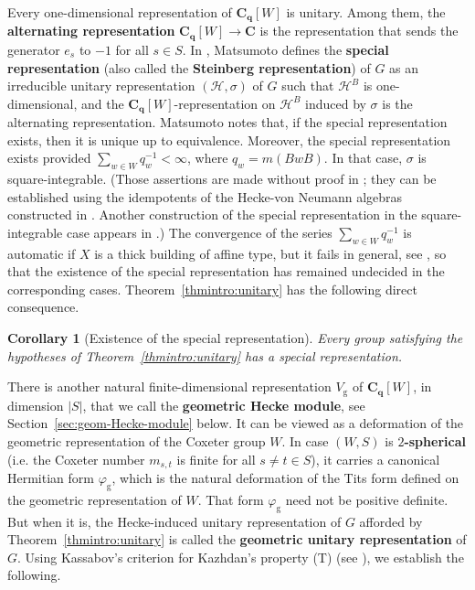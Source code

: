 \documentclass[12pt,a4paper]{amsproc}
\newtheorem{corintro}[thmintro]{Corollary}
\theoremstyle{definition}
\newcommand{\CC}{\mathbf C}
\begin{document}
 Every one-dimensional representation of $\CC_{\mathbf q}[W]$ is unitary. Among them, the \textbf{alternating representation} $\CC_{\mathbf q}[W]\to \CC$ is the representation that sends the generator $e_s$ to $-1$ for all $s \in S$. In \cite[\S 1]{MatsumotoCRAS}, Matsumoto defines the \textbf{special representation} (also called the \textbf{Steinberg representation}) of $G$ as an irreducible unitary representation $(\mathcal H, \sigma)$  of $G$ such that $\mathcal H^B$ is one-dimensional, and the $\CC_{\mathbf q}[W]$-representation on $\mathcal H^B$ induced by $\sigma$ is the alternating representation. Matsumoto notes that,  if the special representation exists, then it is unique up to equivalence. Moreover,   the special representation exists provided $\sum_{w \in W}  q_w^{-1} < \infty$, where $q_w = m(BwB)$. In that case, $\sigma$ is square-integrable. (Those  assertions are made without proof in \cite{MatsumotoCRAS}; they can be established using the idempotents of the Hecke-von Neumann algebras constructed in \cite[\S 19.2]{Davis}. Another construction of the special representation in the square-integrable case appears in \cite[\S 6]{DymJan}.) The convergence of the series  $\sum_{w \in W}q_w^{-1} $ is automatic if $X$ is a thick building of affine type, but it fails in general, see \cite{Bischof}, so that the existence of the special representation has remained undecided in the corresponding cases.   Theorem~\ref{thmintro:unitary} has the following direct consequence. 
 
 \begin{corintro}	[Existence of the special representation]\label{corintro:special}			
Every group satisfying   the hypotheses of Theorem~\ref{thmintro:unitary} has a special representation. 
 \end{corintro}
 
 There is another  natural finite-dimensional representation $V_{\mathrm{g}}$ of $\CC_{\mathbf q}[W]$, in dimension $|S|$, that we call the \textbf{geometric Hecke module}, see Section~\ref{sec:geom-Hecke-module} below. It can be viewed as a deformation of the  geometric representation of the Coxeter group $W$. In case $(W, S)$ is \textbf{$2$-spherical} (i.e. the Coxeter number $m_{s, t}$ is finite for all $s \neq t \in S$), it carries a  canonical Hermitian form $\varphi_{\mathrm{g}}$, which is  the natural deformation of the Tits form defined on the geometric representation of $W$. That form $\varphi_{\mathrm{g}}$ need not be positive definite. But when it is, the Hecke-induced unitary representation of $G$ afforded by Theorem~\ref{thmintro:unitary} is called the \textbf{geometric unitary representation} of $G$. Using Kassabov's criterion for Kazhdan's property (T) (see \cite{Ka11}), we establish the following. 
 
\end{document}
